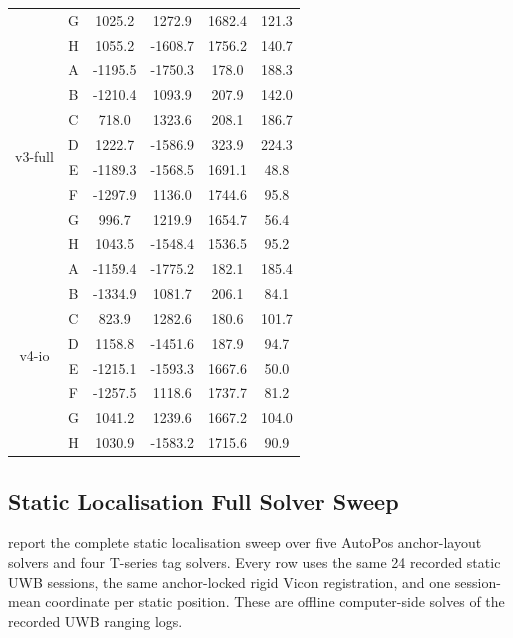 \documentclass[11pt,a4paper]{article}
\begin{document}
\begin{table}[H]
\begin{tabular}{c c c c c c}
  & G &  1025.2 &  1272.9 & 1682.4 & 121.3 \\
  & H &  1055.2 & -1608.7 & 1756.2 & 140.7 \\
\midrule
\multirow{8}{*}{v3-full}
  & A & -1195.5 & -1750.3 &  178.0 & 188.3 \\
  & B & -1210.4 &  1093.9 &  207.9 & 142.0 \\
  & C &   718.0 &  1323.6 &  208.1 & 186.7 \\
  & D &  1222.7 & -1586.9 &  323.9 & 224.3 \\
  & E & -1189.3 & -1568.5 & 1691.1 &  48.8 \\
  & F & -1297.9 &  1136.0 & 1744.6 &  95.8 \\
  & G &   996.7 &  1219.9 & 1654.7 &  56.4 \\
  & H &  1043.5 & -1548.4 & 1536.5 &  95.2 \\
\midrule
\multirow{8}{*}{v4-io}
  & A & -1159.4 & -1775.2 &  182.1 & 185.4 \\
  & B & -1334.9 &  1081.7 &  206.1 &  84.1 \\
  & C &   823.9 &  1282.6 &  180.6 & 101.7 \\
  & D &  1158.8 & -1451.6 &  187.9 &  94.7 \\
  & E & -1215.1 & -1593.3 & 1667.6 &  50.0 \\
  & F & -1257.5 &  1118.6 & 1737.7 &  81.2 \\
  & G &  1041.2 &  1239.6 & 1667.2 & 104.0 \\
  & H &  1030.9 & -1583.2 & 1715.6 &  90.9 \\
\bottomrule
\end{tabular}
\end{table}

\subsection{Static Localisation Full Solver Sweep}
\label{app:static_solver_matrix}

 report the complete static localisation sweep over five AutoPos anchor-layout solvers and four T-series tag solvers.
Every row uses the same 24 recorded static UWB sessions, the same anchor-locked rigid Vicon registration, and one session-mean coordinate per static position.
These are offline computer-side solves of the recorded UWB ranging logs.
\end{document}

